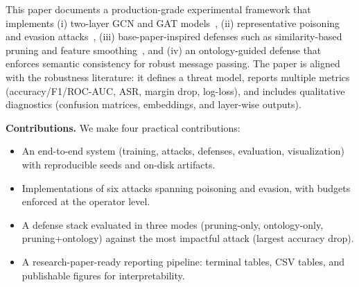 \documentclass[conference]{IEEEtran}
\begin{document}
This paper documents a production-grade experimental framework that implements (i) two-layer GCN and GAT models~\cite{kipf2017gcn,velickovic2018gat}, (ii) representative poisoning and evasion attacks~\cite{zugner2018nettack,zugner2019metattack,goodfellow2015fgsm}, (iii) base-paper-inspired defenses such as similarity-based pruning and feature smoothing~\cite{wu2019jaccard,zhang2020gnnguard}, and (iv) an ontology-guided defense that enforces semantic consistency for robust message passing. The paper is aligned with the robustness literature: it defines a threat model, reports multiple metrics (accuracy/F1/ROC-AUC, ASR, margin drop, log-loss), and includes qualitative diagnostics (confusion matrices, embeddings, and layer-wise outputs).

\textbf{Contributions.} We make four practical contributions:
\begin{itemize}
\item An end-to-end system (training, attacks, defenses, evaluation, visualization) with reproducible seeds and on-disk artifacts.
\item Implementations of six attacks spanning poisoning and evasion, with budgets enforced at the operator level.
\item A defense stack evaluated in three modes (pruning-only, ontology-only, pruning+ontology) against the most impactful attack (largest accuracy drop).
\item A research-paper-ready reporting pipeline: terminal tables, CSV tables, and publishable figures for interpretability.
\end{itemize}
\end{document}
